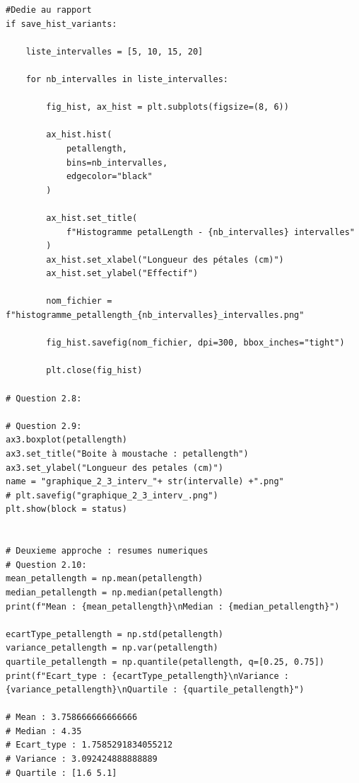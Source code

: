 \documentclass[12pt,a4paper]{article}
\begin{document}
\begin{lstlisting}
#Dedie au rapport
if save_hist_variants:

    liste_intervalles = [5, 10, 15, 20]

    for nb_intervalles in liste_intervalles:

        fig_hist, ax_hist = plt.subplots(figsize=(8, 6))

        ax_hist.hist(
            petallength,
            bins=nb_intervalles,
            edgecolor="black"
        )

        ax_hist.set_title(
            f"Histogramme petalLength - {nb_intervalles} intervalles"
        )
        ax_hist.set_xlabel("Longueur des pétales (cm)")
        ax_hist.set_ylabel("Effectif")

        nom_fichier = f"histogramme_petallength_{nb_intervalles}_intervalles.png"

        fig_hist.savefig(nom_fichier, dpi=300, bbox_inches="tight")

        plt.close(fig_hist)

# Question 2.8: 

# Question 2.9: 
ax3.boxplot(petallength)
ax3.set_title("Boite à moustache : petallength")
ax3.set_ylabel("Longueur des petales (cm)")
name = "graphique_2_3_interv_"+ str(intervalle) +".png"
# plt.savefig("graphique_2_3_interv_.png")
plt.show(block = status)


# Deuxieme approche : resumes numeriques
# Question 2.10:
mean_petallength = np.mean(petallength)
median_petallength = np.median(petallength)
print(f"Mean : {mean_petallength}\nMedian : {median_petallength}")

ecartType_petallength = np.std(petallength)
variance_petallength = np.var(petallength)
quartile_petallength = np.quantile(petallength, q=[0.25, 0.75])
print(f"Ecart_type : {ecartType_petallength}\nVariance : {variance_petallength}\nQuartile : {quartile_petallength}")

# Mean : 3.758666666666666
# Median : 4.35
# Ecart_type : 1.7585291834055212
# Variance : 3.092424888888889
# Quartile : [1.6 5.1]


\end{lstlisting}
\end{document}

